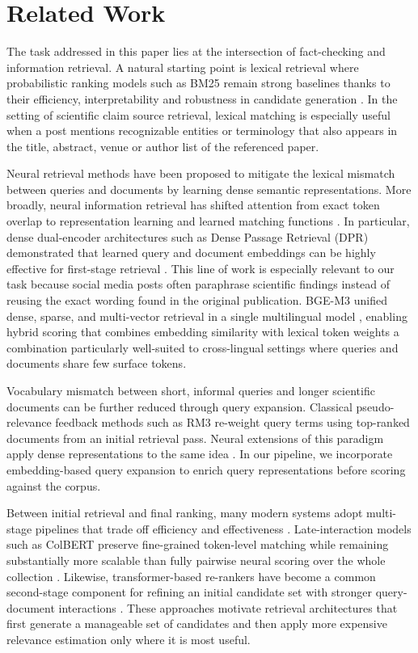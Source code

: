 \section{Related Work}
\label{sec:related}

The task addressed in this paper lies at the intersection of fact-checking and information retrieval. A natural starting point is lexical retrieval where probabilistic ranking models such as BM25 remain strong baselines thanks to their efficiency, interpretability and robustness in candidate generation \citep{RobertsonZaragoza2009}. In the setting of scientific claim source retrieval, lexical matching is especially useful when a post mentions recognizable entities or terminology that also appears in the title, abstract, venue or author list of the referenced paper.

Neural retrieval methods have been proposed to mitigate the lexical mismatch between queries and documents by learning dense semantic representations. More broadly, neural information retrieval has shifted attention from exact token overlap to representation learning and learned matching functions \citep{MarchesinEtAl2020}. In particular, dense dual-encoder architectures such as Dense Passage Retrieval (DPR) demonstrated that learned query and document embeddings can be highly effective for first-stage retrieval \citep{KarpukhinEtAl2020}. This line of work is especially relevant to our task because social media posts often paraphrase scientific findings instead of reusing the exact wording found in the original publication. BGE-M3 unified dense, sparse, and multi-vector retrieval in a single multilingual model \citep{ChenEtAl2024}, 
enabling hybrid scoring that combines embedding similarity with lexical token weights a combination particularly well-suited to cross-lingual settings where queries and documents share few surface tokens.

Vocabulary mismatch between short, informal queries and longer scientific documents can be further reduced through query expansion. Classical pseudo-relevance feedback methods such as RM3 \citep{LavrenkoEtAl2001} re-weight query terms using top-ranked documents from an initial retrieval pass. Neural extensions of this paradigm apply dense representations to the same idea \citep{WangEtAl2021PRF}. In our pipeline, we incorporate embedding-based query expansion to enrich query representations before scoring against the corpus.

Between initial retrieval and final ranking, many modern systems adopt multi-stage pipelines that trade off efficiency and effectiveness \citep{MarchesinEtAl2020}. Late-interaction models such as ColBERT preserve fine-grained token-level matching while remaining substantially more scalable than fully pairwise neural scoring over the whole collection \citep{KhattabZaharia2020}. Likewise, transformer-based re-rankers have become a common second-stage component for refining an initial candidate set with stronger query-document interactions \citep{NogueiraEtAl2020}. These approaches motivate retrieval architectures that first generate a manageable set of candidates and then apply more expensive relevance estimation only where it is most useful.

